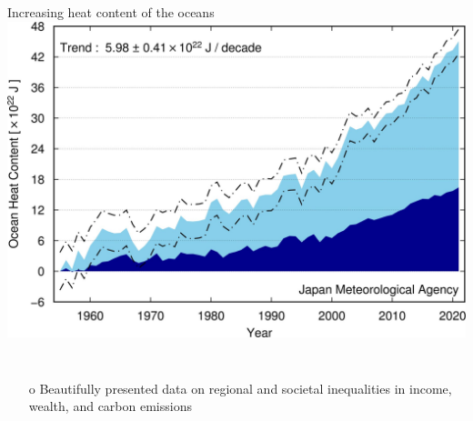 \documentclass[9pt,handout,aspectratio=169]{beamer}
\begin{document}
\begin{frame}
\begin{scriptsize}
\begin{columns}
      \begin{center}
        {\scriptsize \cb Increasing heat content of the oceans}
          \includegraphics[width=1.0\textwidth]{plots/JMO_sea_heat}
      \end{center}      
    \end{columns}

  \end{scriptsize}
  \end{frame}




\begin{frame}
  \begin{small}
              
  \begin{columns}
    \begin{itemize}\setlength\itemsep{1.0ex}\footnotesize
      \item[o] Beautifully presented data on regional and societal inequalities in income, wealth, and carbon emissions
    \end{itemize}
  \end{columns}

  \end{small}
  \end{frame}
\end{document}
